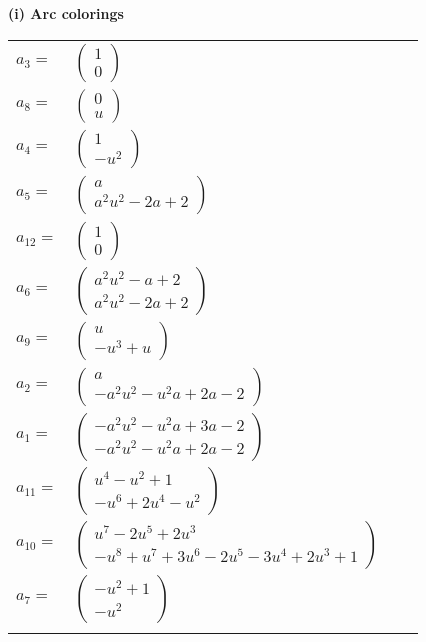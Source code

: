 \documentclass[1p]{elsarticle_modified}
\theoremstyle{definition}
\begin{document}
\flushleft \textbf{(i) Arc colorings}\\
\begin{tabular}{m{7pt} m{180pt} m{7pt} m{180pt} }
\flushright $a_{3}=$&$\begin{pmatrix}1\\0\end{pmatrix}$ \\
\flushright $a_{8}=$&$\begin{pmatrix}0\\u\end{pmatrix}$ \\
\flushright $a_{4}=$&$\begin{pmatrix}1\\- u^2\end{pmatrix}$ \\
\flushright $a_{5}=$&$\begin{pmatrix}a\\a^2 u^2-2 a+2\end{pmatrix}$ \\
\flushright $a_{12}=$&$\begin{pmatrix}1\\0\end{pmatrix}$ \\
\flushright $a_{6}=$&$\begin{pmatrix}a^2 u^2- a+2\\a^2 u^2-2 a+2\end{pmatrix}$ \\
\flushright $a_{9}=$&$\begin{pmatrix}u\\- u^3+u\end{pmatrix}$ \\
\flushright $a_{2}=$&$\begin{pmatrix}a\\- a^2 u^2- u^2 a+2 a-2\end{pmatrix}$ \\
\flushright $a_{1}=$&$\begin{pmatrix}- a^2 u^2- u^2 a+3 a-2\\- a^2 u^2- u^2 a+2 a-2\end{pmatrix}$ \\
\flushright $a_{11}=$&$\begin{pmatrix}u^4- u^2+1\\- u^6+2 u^4- u^2\end{pmatrix}$ \\
\flushright $a_{10}=$&$\begin{pmatrix}u^7-2 u^5+2 u^3\\- u^8+u^7+3 u^6-2 u^5-3 u^4+2 u^3+1\end{pmatrix}$ \\
\flushright $a_{7}=$&$\begin{pmatrix}- u^2+1\\- u^2\end{pmatrix}$\\&\end{tabular}
\end{document}
